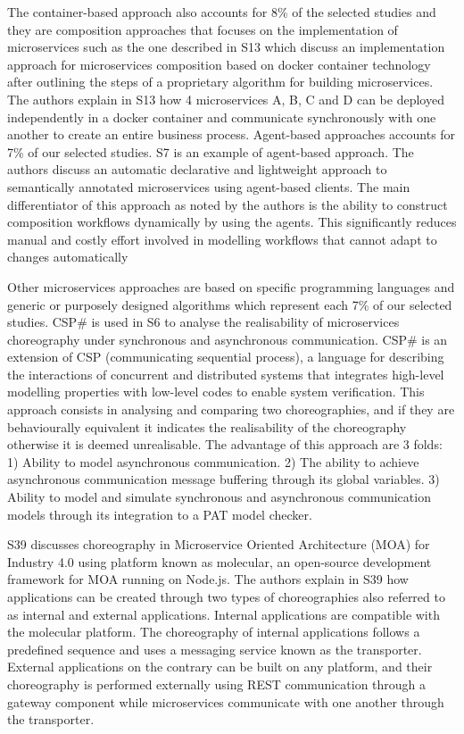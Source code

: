 \documentclass{article}
\begin{document}
\begin{multicols}{2}
The container-based approach also accounts for 8\% of the selected studies and they are composition approaches that focuses on the implementation of microservices such as the one described in S13 which discuss an implementation approach for microservices composition based on docker container technology after outlining the steps of a proprietary algorithm for building microservices. The authors explain in S13 how 4 microservices A, B, C and D can be deployed independently in a docker container and communicate synchronously with one another to create an entire business process. Agent-based approaches accounts for 7\% of our selected studies. S7 is an example of agent-based approach. The authors discuss an automatic declarative and lightweight approach to semantically annotated microservices using agent-based clients. The main differentiator of this approach as noted by the authors is the ability to construct composition workflows dynamically by using the agents. This significantly reduces manual and costly effort involved in modelling workflows that cannot adapt to changes automatically 

Other microservices approaches are based on specific programming languages and generic or purposely designed algorithms which represent each 7\% of our selected studies. CSP\# is used in S6 to analyse the realisability of microservices choreography under synchronous and asynchronous communication. CSP\# is an extension of CSP (communicating sequential process), a language for describing the interactions of concurrent and distributed systems that integrates  high-level modelling properties with low-level codes to enable system verification. This approach consists in analysing and comparing two choreographies, and if they are behaviourally equivalent it indicates the realisability of the choreography otherwise it is deemed unrealisable. The advantage of this approach are 3 folds: 1) Ability to model asynchronous communication. 2) The ability to achieve asynchronous communication message buffering through its global variables. 3) Ability to model and simulate synchronous and asynchronous communication models through its integration to a PAT model checker.

S39 discusses choreography in Microservice Oriented Architecture (MOA) for Industry 4.0 using platform known as molecular,  an open-source development framework for MOA running on Node.js. The authors explain in S39 how applications can be created through two types of choreographies also referred to as internal and external applications. Internal applications are compatible with the molecular platform. The choreography of internal applications follows a predefined sequence and uses a messaging service known as the transporter. External applications on the contrary can be built on any platform, and their choreography is performed externally using REST communication through a gateway component while microservices communicate with one another through the transporter.


\end{multicols}
\end{document}
